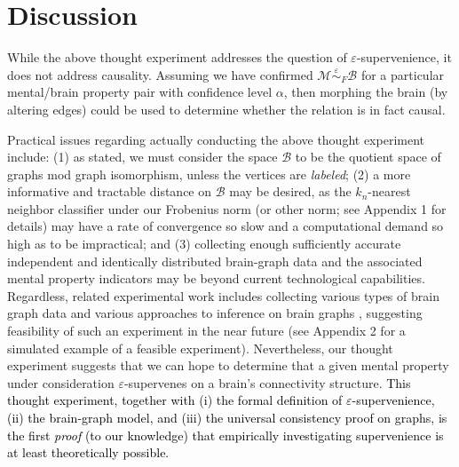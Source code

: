 \documentclass{article}
\newcommand{\mB}{\mathcal{B}}
\newcommand{\mM}{\mathcal{M}}
\newcommand{\MeB}{\mM \overset{\varepsilon}{{\sim}}_F \mB}
\providecommand{\tr}[1]{\textcolor{black}{#1}}
\begin{document}
\section{Discussion}

While the above thought experiment addresses the question of $\varepsilon$-supervenience, it does not address causality. Assuming we have confirmed $\MeB$ for a particular mental/brain property pair with confidence level $\alpha$, then morphing the brain (by altering edges) could be used to determine whether the relation is in fact causal.

Practical issues regarding actually conducting the above thought experiment include: (1) as stated, we must consider the space $\mB$ to be the quotient space of graphs mod graph isomorphism, unless the vertices are {\it labeled}; (2) a more informative and tractable distance on $\mB$ may be desired, as the $k_n$-nearest neighbor classifier under our Frobenius norm (or other norm; see Appendix 1 for details) may have a rate of convergence so slow and a computational demand so high as to be impractical; and (3) collecting enough sufficiently accurate independent and identically distributed brain-graph data and the associated mental property indicators may be beyond current technological capabilities. Regardless, related experimental work includes collecting various types of brain graph data \cite{WhiteBrenner86, DenkHorstmann04, BriggmanDenk06} and various approaches to inference on brain graphs \cite{MackeBorst08, Mishchenko09, LuLichtman09}, suggesting feasibility of such an experiment in the near future (see Appendix 2 for a simulated example of a feasible experiment). Nevertheless, our thought experiment suggests that we can hope to determine that a given mental property under consideration $\varepsilon$-supervenes on a brain's connectivity structure. \tr{This thought experiment, together with (i) the formal definition of $\varepsilon$-supervenience, (ii) the brain-graph model, and (iii) the universal consistency proof on graphs, is the first \emph{proof} (to our knowledge) that empirically investigating supervenience is at least theoretically possible.}


\end{document}
